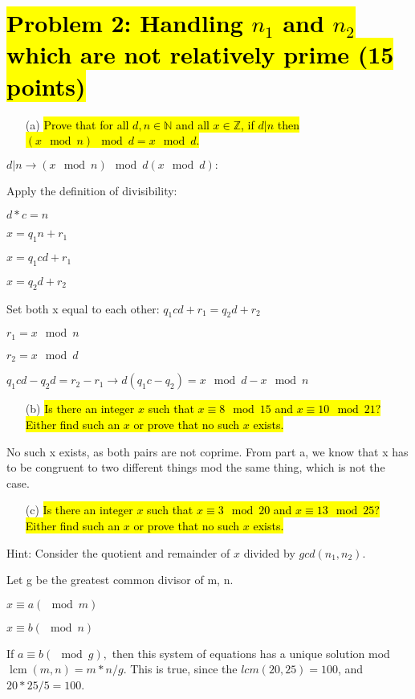 \documentclass[12pt]{article}
\def\lcm{{\operatorname{lcm}}}             %
\begin{document}
\section*{\hl{Problem 2: Handling $n_1$ and $n_2$ which are not relatively prime (15 
points)}}
\begin{enumerate}
\item[(a)] \hl{Prove that for all $d,n \in \mathbb{N}$ and all $x \in \mathbb{Z}$, if 
$d | n$ then $(x \mod n) \mod d = x \mod d$.}
\end{enumerate}
\item $d|n \rightarrow (x \mod n)\mod d (x \mod d):$
\item Apply the definition of divisibility:
\item $d*c = n$
\item $x = q_{1}n + r_{1}$
\item $x = q_{1}cd + r_{1}$
\item $x = q_{2}d + r_{2}$
\item Set both x equal to each other: $q_{1}cd + r_1 = q_2d+r_2$
\item $r_1 = x \mod n$
\item $r_2 = x \mod d$
\item $q_1cd -q_2d = r_2 - r_1 \rightarrow d(q_1c-q_2) = x \mod d - x \mod n$
\item 

\begin{enumerate}
\item[(b)] \hl{Is there an integer $x$ such that $x \equiv 8 \mod 15$ and $x \equiv 
10 \mod 21$? Either find such an $x$ or prove that no such $x$ exists.}
\end{enumerate}

\item No such x exists, as both pairs are not coprime. From part a, we know that x has to be congruent to two different things mod the same thing, which is not the case.

\begin{enumerate}
\item[(c)] \hl{Is there an integer $x$ such that $x \equiv 3 \mod 20$ and $x \equiv 
13 \mod 25$? Either find such an $x$ or prove that no such $x$ exists.}
\end{enumerate}

Hint: Consider the quotient and remainder of $x$ divided by $gcd(n_1,n_2)$.

\item Let g be the greatest common divisor of m, n.
\item $x \equiv a (\mod m)$
\item $x \equiv b (\mod n)$
\item If $a \equiv b (\mod g),$ then this system of equations has a unique solution mod $\lcm(m,n) = m*n/g.$ This is true, since the $lcm(20, 25) = 100$, and $20*25/5 = 100$. 
\end{document}
